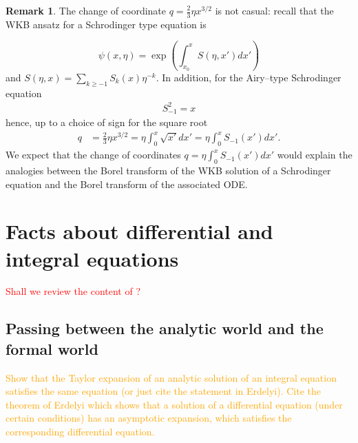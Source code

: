 \documentclass{article}
\theoremstyle{definition}
\newtheorem{remark}[definition]{Remark}
\theoremstyle{plain}
\begin{document}
\begin{remark}
The change of coordinate $q=\frac{2}{3}\eta x^{3/2}$ is not casual: recall that the WKB ansatz for a Schrodinger type equation is

\begin{equation}
\psi(x,\eta)=\exp\left(\int_{x_0}^xS(\eta,x')dx'\right)
\end{equation} 
 and $S(\eta,x)=\sum_{k\geq -1}S_k(x)\eta^{-k}$. In addition, for the Airy--type Schrodinger equation 
 \begin{align*}
 S_{-1}^2=x
 \end{align*}
hence, up to a choice of sign for the square root
\begin{align*}
q&=\frac{2}{3}\eta x^{3/2}=\eta\int_0^x\sqrt{x'}dx'=\eta\int_{0}^xS_{-1}(x')dx'.
\end{align*}
We expect that the change of coordinates $q=\eta\int_0^{x}S_{-1}(x')dx'$ would explain the analogies between the Borel transform of the WKB solution of a Schrodinger equation and the Borel transform of the associated ODE.  
\end{remark} 

\section{Facts about differential and integral equations}\label{apx:generalities_ODEs}
\textcolor{red}{Shall we review the content of \cite{reg-sing-volterra}?}
\subsection{Passing between the analytic world and the formal world}
\textcolor{orange}{Show that the Taylor expansion of an analytic solution of an integral equation satisfies the same equation (or just cite the statement in Erdelyi). Cite the theorem of Erdelyi which shows that a solution of a differential equation (under certain conditions) has an asymptotic expansion, which satisfies the corresponding differential equation.}
\end{document}
